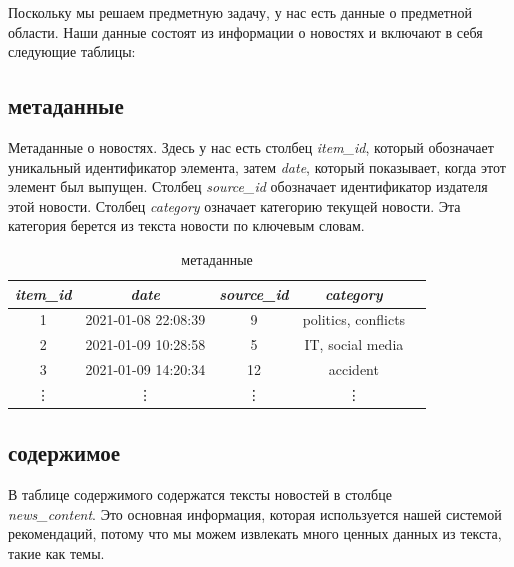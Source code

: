 \documentclass[14pt]{matmex-diploma-custom}
\begin{document}
Поскольку мы решаем предметную задачу, у нас есть данные о предметной области.
Наши данные состоят из информации о новостях и включают в себя следующие таблицы:

\subsection*{метаданные}

Метаданные о новостях. Здесь у нас есть столбец \textit {item\_id}, который обозначает уникальный идентификатор элемента, затем \textit{date}, который показывает, когда этот элемент был выпущен. Столбец \textit {source\_id} обозначает идентификатор издателя этой новости. Столбец \textit {category} означает категорию текущей новости. Эта категория берется из текста новости по ключевым словам.


\begin{table}[h]
    \centering
    \begin{tabular}{ccccc}
        \toprule

        \emph{item\_id} & \emph{date} & \emph{source\_id} & \emph{category}\\\midrule

        1 & 2021-01-08 22:08:39 & 9  & politics, conflicts\\
        2 & 2021-01-09 10:28:58 & 5  & IT, social media\\
        3 & 2021-01-09 14:20:34 & 12 & accident\\
        \vdots & \vdots & \vdots & \vdots \\\bottomrule
    \end{tabular}

    \caption{метаданные}
    \label{tab:meta}
\end{table}




\subsection*{содержимое}

В таблице содержимого содержатся тексты новостей в столбце \\
\textit {news\_content}. Это основная информация, которая используется нашей системой рекомендаций, потому что мы можем извлекать много ценных данных из текста, такие как темы.
\end{document}

